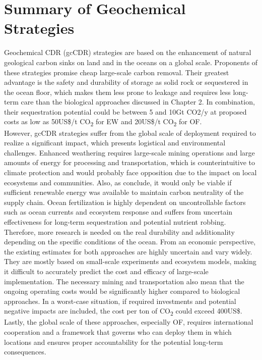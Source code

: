 \section{Summary of Geochemical Strategies}
Geochemical CDR (gcCDR) strategies are based on the enhancement of natural geological carbon sinks on land and in the oceans on a global scale. Proponents of these strategies promise cheap large-scale carbon removal. Their greatest advantage is the safety and durability of storage as solid rock or sequestered in the ocean floor, which makes them less prone to leakage and requires less long-term care than the biological approaches discussed in Chapter 2. In combination, their sequestration potential could be between 5 and 10Gt CO2/y at proposed costs as low as 50US\$/t CO\textsubscript{2} for EW and 20US\$/t CO\textsubscript{2} for OF.\\
However, gcCDR strategies suffer from the global scale of deployment required to realize a significant impact, which presents logistical and environmental challenges. Enhanced weathering requires large-scale mining operations and large amounts of energy for processing and transportation, which is counterintuitive to climate protection and would probably face opposition due to the impact on local ecosystems and communities. Also, as \textcite{Goll2021PotentialRock} conclude, it would only be viable if sufficient renewable energy was available to maintain carbon neutrality of the supply chain.
Ocean fertilization is highly dependent on uncontrollable factors such as ocean currents and ecosystem response and suffers from uncertain effectiveness for long-term sequestration and potential nutrient robbing. Therefore, more research is needed on the real durability and additionality depending on the specific conditions of the ocean.
From an economic perspective, the existing estimates for both approaches are highly uncertain and vary widely. They are mostly based on small-scale experiments and ecosystem models, making it difficult to accurately predict the cost and efficacy of large-scale implementation. The necessary mining and transportation also mean that the ongoing operating costs would be significantly higher compared to biological approaches. In a worst-case situation, if required investments and potential negative impacts are included, the cost per ton of CO\textsubscript{2} could exceed 400US\$.
Lastly, the global scale of these approaches, especially OF, requires international cooperation and a framework that governs who can deploy them in which locations and ensures proper accountability for the potential long-term consequences.